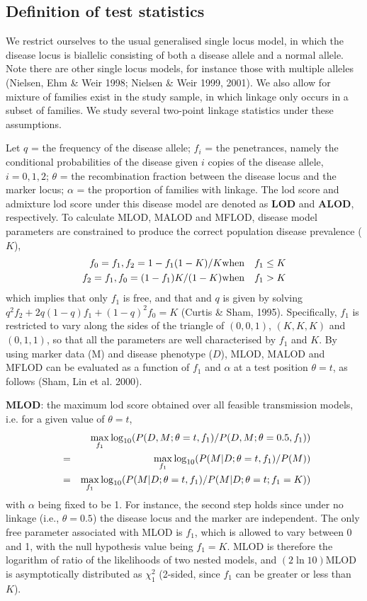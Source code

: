 \subsection*{Definition of test statistics}

We restrict ourselves to the usual generalised single locus model, in
which the disease locus is biallelic consisting of both a disease allele
and a normal allele. Note there are other single locus models, for
instance those with multiple alleles (Nielsen, Ehm \& Weir 1998; Nielsen
\& Weir 1999, 2001). We also allow for mixture of families exist in the
study sample, in which linkage only occurs in a subset of families. We
study several two-point linkage statistics under these assumptions.

Let $q$ = the frequency of the disease allele; $f_i$ = the penetrances,
namely the conditional probabilities of the disease given $i$ copies of
the disease allele, $i=0, 1, 2$; $\theta$ = the recombination fraction
between the disease locus and the marker locus; $\alpha$ = the proportion
of families with linkage. The lod score and admixture lod score under this
disease model are denoted as {\bf LOD} and {\bf ALOD}, respectively.  To
calculate MLOD, MALOD and MFLOD, disease model parameters are constrained
to produce the correct population disease prevalence ($K$),
\begin{eqnarray}
f_0 = f_1, f_2 = 1-f_1(1-K)/K  &\mbox{when}& f_1\leq K \cr
f_2 = f_1, f_0 = (1-f_1)K/(1-K)  &\mbox{when}& f_1>K\label{f1}
\end{eqnarray}
which implies that only $f_1$ is free, and that and $q$ is given by
solving $q^2f_2+2q(1-q)f_1+(1-q)^2f_0 = K$ (Curtis \& Sham, 1995).  
Specifically, $f_1$ is restricted to vary along the sides of the triangle
of $(0,0,1)$, $(K,K,K)$ and $(0, 1, 1)$, so that all the parameters are
well characterised by $f_1$ and $K$.  By using marker data (M) and disease
phenotype ($D$), MLOD, MALOD and MFLOD can be evaluated as a function of
$f_1$ and $\alpha$ at a test position $\theta=t$, as follows (Sham, Lin et
al.  2000).

{\bf MLOD}:  the maximum lod score obtained over all feasible transmission
models, i.e. for a given value of $\theta=t$,
\begin{eqnarray*}
~ &~&\max\limits_{f_1}
\log_{10}(P(D,M;\theta=t,f_1)/P(D,M;\theta=0.5,f_1)) \cr
&=&\max\limits_{f_1}\log_{10}(P(M|D;\theta=t,f_1)/P(M)) \cr
&=&\max\limits_{f_1}\log_{10}(P(M|D;\theta=t,f_1)/P(M|D;\theta=t;f_1=K))
\end{eqnarray*}
with $\alpha$ being fixed to be 1.  For instance, the second step holds since
under no linkage (i.e., $\theta=0.5$) the disease locus and the marker are
independent.  The only free parameter associated with MLOD is $f_1$, which is
allowed to vary between 0 and 1, with the null hypothesis value being $f_1=K$.
MLOD is therefore the logarithm of ratio of the likelihoods of two nested
models, and $(2\ln 10)$MLOD is asymptotically distributed as $\chi_1^2$
(2-sided, since $f_1$ can be greater or less than $K$).

